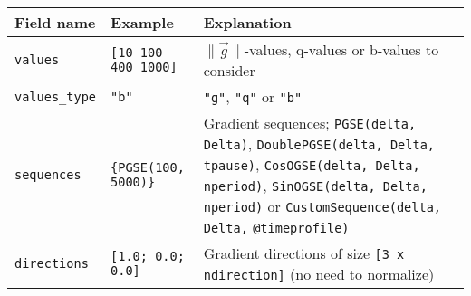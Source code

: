 \begin{tabular}{|l|l|p{6cm}|} \hline

    Field name              & Example                 & Explanation                                                                                                                                                               \\ \hline

    \verb+values+  & \verb+[10 100 400 1000]+  & $\|\vec{g}\|$-values, q-values or b-values to consider                                                                                                                    \\ \hline
    \verb+values_type+  & \verb+"b"+  & \verb+"g"+, \verb+"q"+ or \verb+"b"+                                                                                                  \\ \hline
    \verb+sequences+  & \verb+{PGSE(100, 5000)}+  & Gradient sequences; \verb+PGSE(delta, Delta)+, \verb+DoublePGSE(delta, Delta, tpause)+, \verb+CosOGSE(delta, Delta, nperiod)+, \verb+SinOGSE(delta, Delta, nperiod)+ or \verb+CustomSequence(delta, Delta,+ \verb+@timeprofile)+ \\ \hline
    \verb+directions+ & \verb+[1.0; 0.0; 0.0]+ & Gradient directions of size \verb+[3 x ndirection]+ (no need to normalize)                                                                                                \\ \hline
\end{tabular}

